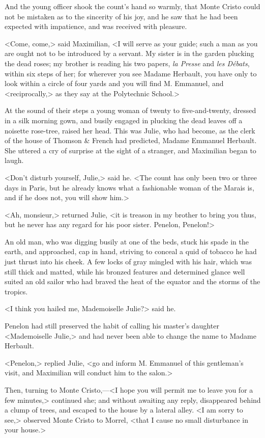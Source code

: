  And the young officer shook the count's hand so warmly, that Monte Cristo could not be mistaken as to the sincerity of his joy, and he saw that he had been expected with impatience, and was received with pleasure. 

 <Come, come,> said Maximilian, <I will serve as your guide; such a man as you are ought not to be introduced by a servant. My sister is in the garden plucking the dead roses; my brother is reading his two papers, \textit{la Presse} and \textit{les Débats}, within six steps of her; for wherever you see Madame Herbault, you have only to look within a circle of four yards and you will find M. Emmanuel, and <reciprocally,> as they say at the Polytechnic School.> 

 At the sound of their steps a young woman of twenty to five-and-twenty, dressed in a silk morning gown, and busily engaged in plucking the dead leaves off a noisette rose-tree, raised her head. This was Julie, who had become, as the clerk of the house of Thomson \& French had predicted, Madame Emmanuel Herbault. She uttered a cry of surprise at the sight of a stranger, and Maximilian began to laugh. 

 <Don't disturb yourself, Julie,> said he. <The count has only been two or three days in Paris, but he already knows what a fashionable woman of the Marais is, and if he does not, you will show him.> 

 <Ah, monsieur,> returned Julie, <it is treason in my brother to bring you thus, but he never has any regard for his poor sister. Penelon, Penelon!> 

 An old man, who was digging busily at one of the beds, stuck his spade in the earth, and approached, cap in hand, striving to conceal a quid of tobacco he had just thrust into his cheek. A few locks of gray mingled with his hair, which was still thick and matted, while his bronzed features and determined glance well suited an old sailor who had braved the heat of the equator and the storms of the tropics. 

 <I think you hailed me, Mademoiselle Julie?> said he. 

 Penelon had still preserved the habit of calling his master's daughter <Mademoiselle Julie,> and had never been able to change the name to Madame Herbault. 

 <Penelon,> replied Julie, <go and inform M. Emmanuel of this gentleman's visit, and Maximilian will conduct him to the salon.> 

 Then, turning to Monte Cristo,—<I hope you will permit me to leave you for a few minutes,> continued she; and without awaiting any reply, disappeared behind a clump of trees, and escaped to the house by a lateral alley.  <I am sorry to see,> observed Monte Cristo to Morrel, <that I cause no small disturbance in your house.> 


